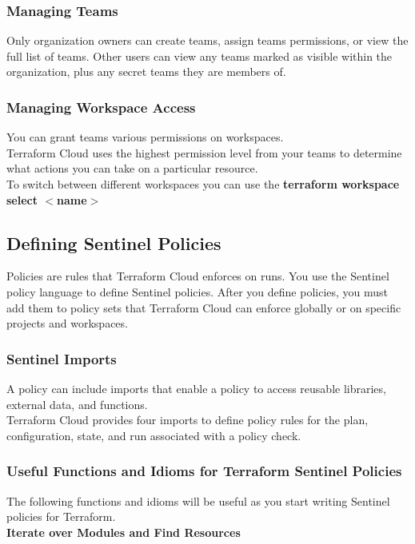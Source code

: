 \documentclass[12pt, letterpaper, twoside]{article}
\begin{document}
\subsubsection{Managing Teams}
Only organization owners can create teams, assign teams permissions, or view the full list of teams. 
Other users can view any teams marked as visible within the organization, plus any secret teams they are members of. 

\subsubsection{Managing Workspace Access}
You can grant teams various permissions on workspaces.\\
Terraform Cloud uses the highest permission level from your teams to determine what actions you can take on 
a particular resource.\\

To switch between different workspaces you can use the \textbf{terraform workspace select $<$name$>$}

\subsection{Defining Sentinel Policies}
Policies are rules that Terraform Cloud enforces on runs. You use the Sentinel policy language to define Sentinel 
policies. After you define policies, you must add them to policy sets that Terraform Cloud can enforce globally 
or on specific projects and workspaces.

\subsubsection{Sentinel Imports}
A policy can include imports that enable a policy to access reusable libraries, external data, and functions.\\
Terraform Cloud provides four imports to define policy rules for the plan, configuration, state, and run 
associated with a policy check.

\subsubsection{Useful Functions and Idioms for Terraform Sentinel Policies}
The following functions and idioms will be useful as you start writing Sentinel policies for Terraform.\\

\textbf{Iterate over Modules and Find Resources}\\
\end{document}
